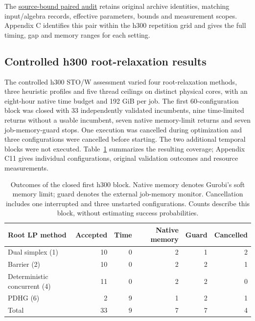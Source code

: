 \documentclass[
  english,
  11pt,
  a4paper,
  authoryear,
  preprint]{elsarticle}
\begin{document}
The
\href{https://github.com/unb-lamfo-or-ai-hpc/model-agrologistic/blob/083ef96cc99a346204df22551ce0739c10e8a2f7/docs/evidence/paired_h300_first_pair_20261101.json}{source-bound
paired audit} retains original archive identities, matching
input/algebra records, effective parameters, bounds and measurement
scopes. Appendix C identifies this pair within the h300 repetition grid
and gives the full timing, gap and memory ranges for each setting.


\subsection{Controlled h300 root-relaxation results}\label{exploratory-h300-root-relaxation-results}

The controlled h300 STO/W assessment varied four root-relaxation methods, three heuristic profiles and five thread ceilings on distinct physical cores, with an eight-hour native time budget and 192 GiB per job. The first 60-configuration block was closed with 33 independently validated incumbents, nine time-limited returns without a usable incumbent, seven native memory-limit returns and seven job-memory-guard stops. One execution was cancelled during optimization and three configurations were cancelled before starting. The two additional temporal blocks were not executed. Table~\ref{tbl-root-partial} summarizes the resulting coverage; Appendix C11 gives individual configurations, original validation outcomes and resource measurements.

\begin{table}[htbp]
\centering\small
\caption{Outcomes of the closed first h300 block. Native memory denotes Gurobi's soft memory limit; guard denotes the external job-memory monitor. Cancellation includes one interrupted and three unstarted configurations. Counts describe this block, without estimating success probabilities.}
\label{tbl-root-partial}
\begin{tabular}{lrrrrr}
\toprule
Root LP method & Accepted & Time & Native memory & Guard & Cancelled\\
\midrule
Dual simplex (1) & 10 & 0 & 2 & 1 & 2\\
Barrier (2) & 10 & 0 & 2 & 2 & 1\\
Deterministic concurrent (4) & 11 & 0 & 2 & 2 & 0\\
PDHG (6) & 2 & 9 & 1 & 2 & 1\\
\midrule
Total & 33 & 9 & 7 & 7 & 4\\
\bottomrule
\end{tabular}
\end{table}
\end{document}
